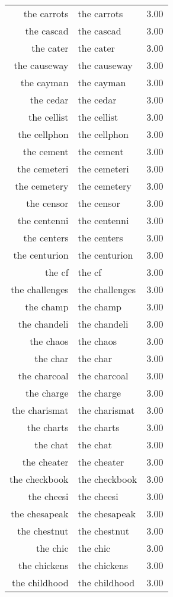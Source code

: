 \begin{table}[ht]
\begin{tabular}{rlr}
  the carrots & the carrots & 3.00 \\ 
  the cascad & the cascad & 3.00 \\ 
  the cater & the cater & 3.00 \\ 
  the causeway & the causeway & 3.00 \\ 
  the cayman & the cayman & 3.00 \\ 
  the cedar & the cedar & 3.00 \\ 
  the cellist & the cellist & 3.00 \\ 
  the cellphon & the cellphon & 3.00 \\ 
  the cement & the cement & 3.00 \\ 
  the cemeteri & the cemeteri & 3.00 \\ 
  the cemetery & the cemetery & 3.00 \\ 
  the censor & the censor & 3.00 \\ 
  the centenni & the centenni & 3.00 \\ 
  the centers & the centers & 3.00 \\ 
  the centurion & the centurion & 3.00 \\ 
  the cf & the cf & 3.00 \\ 
  the challenges & the challenges & 3.00 \\ 
  the champ & the champ & 3.00 \\ 
  the chandeli & the chandeli & 3.00 \\ 
  the chaos & the chaos & 3.00 \\ 
  the char & the char & 3.00 \\ 
  the charcoal & the charcoal & 3.00 \\ 
  the charge & the charge & 3.00 \\ 
  the charismat & the charismat & 3.00 \\ 
  the charts & the charts & 3.00 \\ 
  the chat & the chat & 3.00 \\ 
  the cheater & the cheater & 3.00 \\ 
  the checkbook & the checkbook & 3.00 \\ 
  the cheesi & the cheesi & 3.00 \\ 
  the chesapeak & the chesapeak & 3.00 \\ 
  the chestnut & the chestnut & 3.00 \\ 
  the chic & the chic & 3.00 \\ 
  the chickens & the chickens & 3.00 \\ 
  the childhood & the childhood & 3.00 \\ 

\end{tabular}
\end{table}
